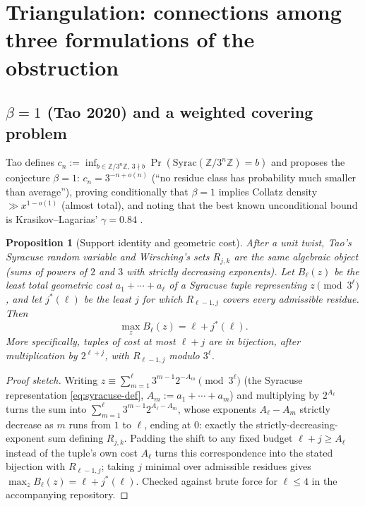 \documentclass[11pt]{article}
\newtheorem{proposition}[theorem]{Proposition}
\theoremstyle{definition}
\theoremstyle{remark}
\begin{document}
\section{Triangulation: connections among three formulations of the
obstruction}
\label{sec:triangulation}

\subsection{$\beta=1$ (Tao 2020) and a weighted covering problem}

Tao \cite{Tao2020} defines $c_n := \inf_{b\in\mathbb{Z}/3^n\mathbb{Z},\,
3\nmid b} \Pr(\mathrm{Syrac}(\mathbb{Z}/3^n\mathbb{Z})=b)$ and proposes
the conjecture $\beta=1$: $c_n = 3^{-n+o(n)}$ (``no residue class has
probability much smaller than average''), proving conditionally that
$\beta=1$ implies Collatz density $\gg x^{1-o(1)}$ (almost total), and
noting that the best known unconditional bound is Krasikov--Lagarias'
$\gamma=0.84$ \cite{KrasikovLagarias2003}.

\begin{proposition}[Support identity and geometric cost]\label{prop:beta-wcc}
After a unit twist, Tao's Syracuse random variable and Wirsching's sets
$R_{j,k}$ are the same algebraic object (sums of powers of $2$ and $3$
with strictly decreasing exponents). Let $B_\ell(z)$ be the least total
geometric cost $a_1+\cdots+a_\ell$ of a Syracuse tuple representing
$z\pmod {3^\ell}$, and let $j^\ast(\ell)$ be the least $j$ for which
$R_{\ell-1,j}$ covers every admissible residue. Then
\[
  \max_z B_\ell(z)=\ell+j^\ast(\ell).
\]
More specifically, tuples of cost at most $\ell+j$ are in bijection,
after multiplication by $2^{\ell+j}$, with $R_{\ell-1,j}$ modulo
$3^\ell$.
\end{proposition}

\begin{proof}[Proof sketch]
Writing $z\equiv\sum_{m=1}^\ell3^{m-1}2^{-A_m}\pmod{3^\ell}$ (the
Syracuse representation \eqref{eq:syracuse-def}, $A_m:=a_1+\cdots+a_m$)
and multiplying by $2^{A_\ell}$ turns the sum into
$\sum_{m=1}^\ell3^{m-1}2^{A_\ell-A_m}$, whose exponents $A_\ell-A_m$
strictly decrease as $m$ runs from $1$ to $\ell$, ending at $0$:
exactly the strictly-decreasing-exponent sum defining $R_{j,k}$.
Padding the shift to any fixed budget $\ell+j\ge A_\ell$ instead of
the tuple's own cost $A_\ell$ turns this correspondence into the
stated bijection with $R_{\ell-1,j}$; taking
$j$ minimal over admissible residues gives
$\max_zB_\ell(z)=\ell+j^\ast(\ell)$. Checked against brute force for
$\ell\le4$ in the accompanying repository.
\end{proof}
\end{document}
